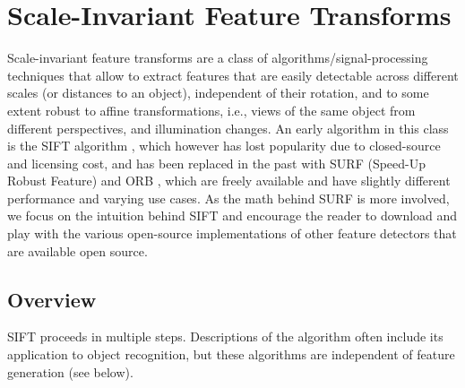 \section{Scale-Invariant Feature Transforms}
Scale-invariant feature transforms are a class of algorithms/signal-processing techniques that allow to extract features that are easily detectable across different scales (or distances to an object), independent of their rotation, and to some extent robust to affine transformations, i.e., views of the same object from different perspectives, and illumination changes. An early algorithm in this class is the SIFT algorithm \cite{lowe1999object}, which however has lost popularity due to closed-source and licensing cost, and has been replaced in the past with SURF (Speed-Up Robust Feature) \cite{bay2006surf} and ORB \cite{rublee2011orb},  which are freely available and have slightly different performance and varying use cases. As the math behind SURF is more involved, we focus on the intuition behind SIFT and encourage the reader to download and play with the various open-source implementations of other feature detectors that are available open source.



\subsection{Overview}
SIFT proceeds in multiple steps. Descriptions of the algorithm often include its application to object recognition, but these algorithms are independent of feature generation (see below).

